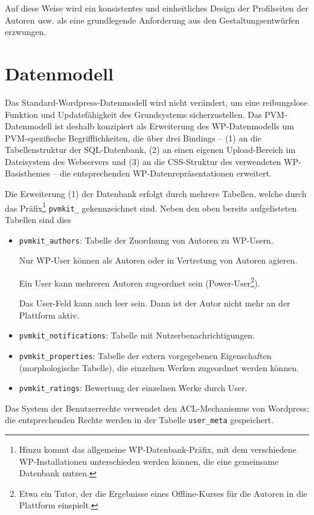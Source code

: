 \documentclass[a4paper,11pt]{article}
\begin{document}
Auf diese Weise wird ein konsistentes und einheitliches Design der
Profilseiten der Autoren usw. als eine grundlegende Anforderung aus den
Gestaltungsentwürfen erzwungen.

\section{Datenmodell}
 
Das Standard-Wordpress-Datenmodell wird nicht verändert, um eine reibungslose
Funktion und Updatefähigkeit des Grundsystems sicherzustellen. Das
PVM-Datenmodell ist deshalb konzipiert als Erweiterung des WP-Datenmodells um
PVM-spezifische Begrifflichkeiten, die über drei Bindings -- (1) an die
Tabellenstruktur der SQL-Datenbank, (2) an einen eigenen Upload-Bereich im
Dateisystem des Webservers und (3) an die CSS-Struktur des verwendeten
WP-Basisthemes -- die entsprechenden WP-Datenrepräsentationen erweitert.

Die Erweiterung (1) der Datenbank erfolgt durch mehrere Tabellen, welche durch
das Präfix\footnote{Hinzu kommt das allgemeine WP-Datenbank-Präfix, mit dem
  verschiedene WP-Installationen unterschieden werden können, die eine
  gemeinsame Datenbank nutzen.} \texttt{pvmkit\_} gekennzeichnet sind. Neben
den oben bereits aufgelisteten Tabellen sind dies
\begin{itemize}\itemsep0pt
\item \texttt{pvmkit\_authors}: Tabelle der Zuordnung von Autoren zu
  WP-Usern.  

  Nur WP-User können als Autoren oder in Vertretung von Autoren agieren.  

  Ein User kann mehreren Autoren zugeordnet sein (Power-User\footnote{Etwa ein
  Tutor, der die Ergebnisse eines Offline-Kurses für die Autoren in die
  Plattform einspielt.}). 

  Das User-Feld kann auch leer sein. Dann ist der Autor nicht mehr an der
  Plattform aktiv.
\item \texttt{pvmkit\_notifications}: Tabelle mit Nutzerbenachrichtigungen. 
\item \texttt{pvmkit\_properties}: Tabelle der extern vorgegebenen
  Eigenschaften (morphologische Tabelle), die einzelnen Werken zugeordnet
  werden können.
\item \texttt{pvmkit\_ratings}: Bewertung der einzelnen Werke durch User.  
\end{itemize}

Das System der Benutzerrechte verwendet den ACL-Mechanismus von Wordpress; die
entsprechenden Rechte werden in der Tabelle \texttt{user\_meta} gespeichert. 
\end{document}
